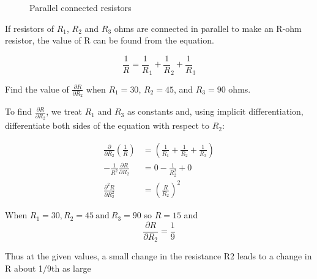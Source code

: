 \documentclass[12pt,a4paper,draft]{article}
\begin{document}
\begin{example}
    \begin{figure}[!ht]
        \centering
        
        \caption{Parallel connected resistors}
        \label{fig:parallelres}
    \end{figure}

    If resistors of \(R_1\), \(R_2\) and \(R_3\) ohms are connected in parallel to make an R-ohm resistor, the value of R can be found from the equation.

    \[\frac1R =  \frac1R_1 + \frac1R_2 + \frac1R_3\]

    Find the value of \(\frac{\partial R}{\partial R_2}\) when \(R_1 = 30\), \(R_2 = 45\), and \(R_3 = 90\) ohms. 

    \begin{solution}
        
        To find \(\frac{\partial R}{\partial R_2}\), we treat \(R_1\) and \(R_3\) as constants and, using implicit differentiation, differentiate both sides of the equation with respect to \(R_2\):

        
        \begin{align*}
            \frac{\partial}{\partial R_2}\left(\frac{1}{R}\right) &= \left(\frac{1}{R_1} + \frac{1}{R_2} + \frac{1}{R_3}\right)\\
            -\frac{1}{R^2} \frac{\partial R}{\partial R_2} &= 0 - \frac{1}{R_2^2} + 0 \\
            \frac{\partial^2 R}{\partial R_2^2} &= \left(\frac{R}{R_2}\right)^2
        \end{align*}
        
        When \(R_1 = 30, R_2 = 45 \ \text{and} \ R_3 = 90 \) so \(R=15\) and
        \[\frac{\partial R}{\partial R_2} = \frac19\]
    \end{solution}
    Thus at the given values, a small change in the resistance R2 leads to a change in R about
    1/9th as large
\end{example}
\end{document}
